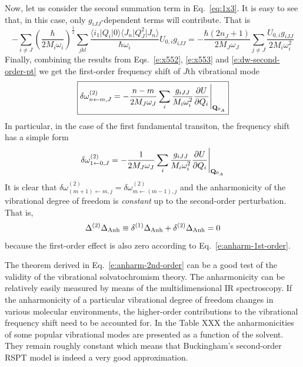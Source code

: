 \documentclass[a4paper,titlepage,twoside,fleqn,12pt]{book}
\begin{document}
\begin{refsection}
Now, let us consider the second summation term in Eq.~\eqref{eq:1x3}.
It is easy to see that, in this case, only $g_{iJJ}$\hyp{}dependent terms will
contribute. That is
%
\begin{equation}  \label{e:x553}
-\sum_{i\ne J} \left( \frac{\hbar}{2M_i\omega_i} \right)^\frac{1}{2}  \sum_{jkl} 
\frac{\langle i_1 \vert Q_i \vert 0 \rangle 
      \langle J_n \vert Q_J^2 \vert J_n \rangle } {\hbar\omega_i}
U_{0,i} g_{iJJ} = 
-\frac{\hbar\left(2n_J+1\right)}{2M_J\omega_J} \sum_{j\ne J} \frac{U_{0,i} g_{iJJ}}{2M_i\omega_i^2}
\end{equation} 
%
Finally, combining the results from Eqs.~\eqref{e:x552}, \eqref{e:x553} and \eqref{e:dw-second-order-pt}
we get the first\hyp{}order frequency shift of $J$th vibrational mode
%
\begin{equation}   \label{e:buckingham-2st-order}
\boxed{
\delta \omega_{n\leftarrow m,J}^{(2)} = 
-\frac{n-m}{2M_J\omega_J} \sum_{i} \frac{g_{iJJ}}{M_i\omega_i^2} 
\frac{\partial U}{\partial Q_i} \Bigg|_{{\bf Q}_{0_A}}
}
\end{equation}
%
In particular, in the case of the first fundamental transiton, the frequency shift 
has a simple form
%
\begin{equation}
\delta \omega_{1\leftarrow 0,J}^{(2)} = 
-\frac{1}{2M_J\omega_J} \sum_{i} \frac{g_{iJJ}}{M_i\omega_i^2} 
\frac{\partial U}{\partial Q_i} \Bigg|_{{\bf Q}_{0_A}}
\end{equation}
%
It is clear that $\delta \omega_{(m+1)\leftarrow m,j}^{(2)} = \delta \omega_{m\leftarrow (m-1),j}^{(2)}$
and the anharmonicity of the vibrational degree of freedom is \emph{constant}
up to the second\hyp{}order perturbation. That is,
%
\begin{equation}  \label{e:anharm-2nd-order}
\Delta^{(2)} \Delta_{\rm Anh} \equiv \delta^{(1)} \Delta_{\rm Anh} + \delta^{(2)} \Delta_{\rm Anh} =  0
\end{equation}
%
because the first\hyp{}order effect is also zero according to Eq.~\eqref{e:anharm-1st-order}. 

The theorem derived in Eq.~\eqref{e:anharm-2nd-order} can be a good test of the validity
of the vibrational solvatochromism theory. The anharmonicity can be relatively easily measured
by means of the multidimensional IR spectroscopy. If the anharmonicity of a particular vibrational 
degree of freedom changes in various molecular environments, the higher\hyp{}order contributions 
to the vibrational frequency shift need to be accounted for. In the Table
XXX the anharmonicities of some popular vibrational modes are presented as a function of the solvent.
They remain roughly constant which means that Buckingham's second\hyp{}order RSPT model is indeed 
a very good approximation.


\end{refsection}
\end{document}
